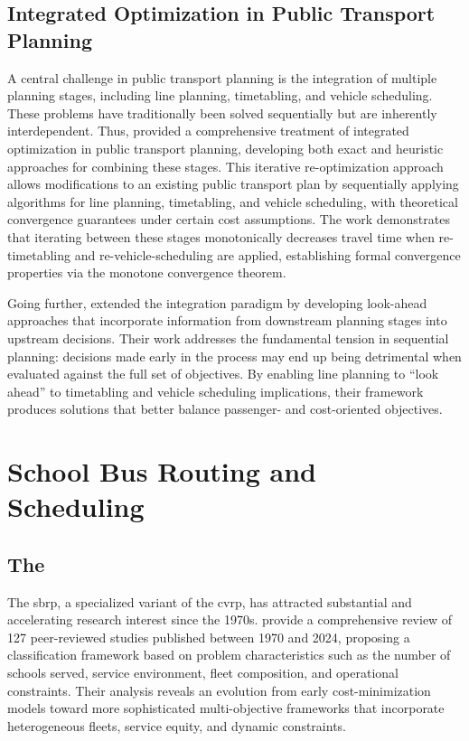 \subsection{Integrated Optimization in Public Transport Planning}

A central challenge in public transport planning is the integration of multiple planning stages, including line planning, timetabling, and vehicle scheduling. These problems have traditionally been solved sequentially but are inherently interdependent. Thus, \textcite{schieweIntegratedOptimizationPublic2020} provided a comprehensive treatment of integrated optimization in public transport planning, developing both exact and heuristic approaches for combining these stages. This iterative re-optimization approach allows modifications to an existing public transport plan by sequentially applying algorithms for line planning, timetabling, and vehicle scheduling, with theoretical convergence guarantees under certain cost assumptions. The work demonstrates that iterating between these stages monotonically decreases travel time when re-timetabling and re-vehicle-scheduling are applied, establishing formal convergence properties via the monotone convergence theorem.

Going further, \textcite{patzoldLookAheadApproachesIntegrated2017} extended the integration paradigm by developing look-ahead approaches that incorporate information from downstream planning stages into upstream decisions. Their work addresses the fundamental tension in sequential planning: decisions made early in the process may end up being detrimental when evaluated against the full set of objectives. By enabling line planning to ``look ahead'' to timetabling and vehicle scheduling implications, their framework produces solutions that better balance passenger- and cost-oriented objectives.

\section{School Bus Routing and Scheduling}
\subsection{The }

The \gls{sbrp}, a specialized variant of the \gls{cvrp}, has attracted substantial and accelerating research interest since the 1970s. \textcite{wang2025School} provide a comprehensive review of 127 peer-reviewed studies published between 1970 and 2024, proposing a classification framework based on problem characteristics such as the number of schools served, service environment, fleet composition, and operational constraints. Their analysis reveals an evolution from early cost-minimization models toward more sophisticated multi-objective frameworks that incorporate heterogeneous fleets, service equity, and dynamic constraints.

